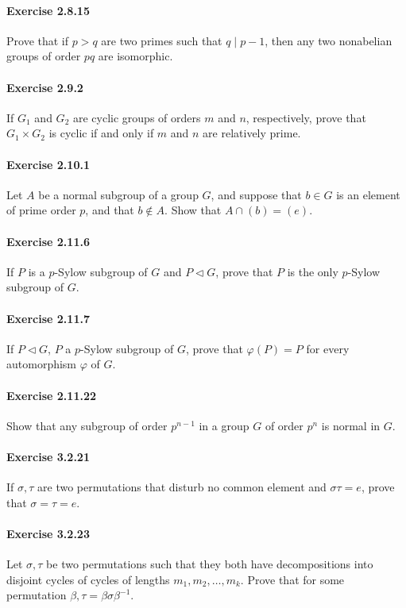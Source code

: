 \documentclass{article}
\begin{document}
\paragraph{Exercise 2.8.15} Prove that if $p > q$ are two primes such that $q \mid p - 1$, then any two nonabelian groups of order $pq$ are isomorphic.

\paragraph{Exercise 2.9.2} If $G_1$ and $G_2$ are cyclic groups of orders $m$ and $n$, respectively, prove that $G_1 \times G_2$ is cyclic if and only if $m$ and $n$ are relatively prime.

\paragraph{Exercise 2.10.1} Let $A$ be a normal subgroup of a group $G$, and suppose that $b \in G$ is an element of prime order $p$, and that $b \not\in A$. Show that $A \cap (b) = (e)$.

\paragraph{Exercise 2.11.6} If $P$ is a $p$-Sylow subgroup of $G$ and $P \triangleleft G$, prove that $P$ is the only $p$-Sylow subgroup of $G$.

\paragraph{Exercise 2.11.7} If $P \triangleleft G$, $P$ a $p$-Sylow subgroup of $G$, prove that $\varphi(P) = P$ for every automorphism $\varphi$ of $G$.

\paragraph{Exercise 2.11.22} Show that any subgroup of order $p^{n-1}$ in a group $G$ of order $p^n$ is normal in $G$.

\paragraph{Exercise 3.2.21} If $\sigma, \tau$ are two permutations that disturb no common element and $\sigma \tau = e$, prove that $\sigma = \tau = e$.

\paragraph{Exercise 3.2.23} Let $\sigma, \tau$ be two permutations such that they both have decompositions into disjoint cycles of cycles of lengths $m_1, m_2, \ldots, m_k$. Prove that for some permutation $\beta, \tau = \beta \sigma \beta^{-1}$.
\end{document}

